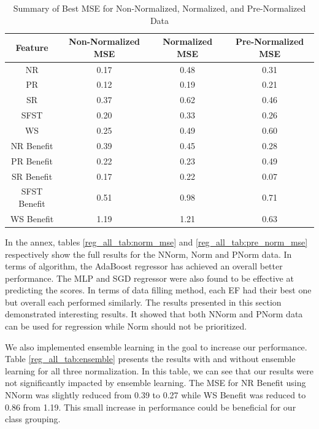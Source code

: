 \documentclass[12pt,letterpaper]{article}
\begin{document}
\begin{table}[H]
\centering
\begin{tabular}{|c|c|c|c|}
\hline
\textbf{Feature} & \textbf{Non-Normalized MSE} & \textbf{Normalized MSE} & \textbf{Pre-Normalized MSE} \\
\hline
NR & 0.17 & 0.48 & 0.31 \\
\hline
PR & 0.12 & 0.19 & 0.21 \\
\hline
SR & 0.37 & 0.62 & 0.46 \\
\hline
SFST & 0.20 & 0.33 & 0.26 \\
\hline
WS & 0.25 & 0.49 & 0.60 \\
\hline
NR Benefit & 0.39 & 0.45 & 0.28 \\
\hline
PR Benefit & 0.22 & 0.23 & 0.49 \\
\hline
SR Benefit & 0.17 & 0.22 & 0.07 \\
\hline
SFST Benefit & 0.51 & 0.98 & 0.71 \\
\hline
WS Benefit & 1.19 & 1.21 & 0.63 \\
\hline
\end{tabular}
\caption{Summary of Best MSE for Non-Normalized, Normalized, and Pre-Normalized Data}
\label{reg_all_tab:mse_summary}
\end{table}


In the annex, tables \ref{reg_all_tab:norm_mse} and \ref{reg_all_tab:pre_norm_mse} respectively show the full results for the NNorm, Norm and PNorm data.
In terms of algorithm, the AdaBoost regressor has achieved an overall better performance.
The MLP and SGD regressor were also found to be effective at predicting the scores.
In terms of data filling method, each \ac{EF} had their best one but overall each performed similarly.
The results presented in this section demonstrated interesting results.
It showed that both NNorm and PNorm data can be used for regression while Norm should not be prioritized.


We also implemented ensemble learning in the goal to increase our performance.
Table \ref{reg_all_tab:ensemble} presents the results with and without ensemble learning for all three normalization.
In this table, we can see that our results were not significantly impacted by ensemble learning.
The MSE for \ac{NR} Benefit using NNorm was slightly reduced from 0.39 to 0.27 while \ac{WS} Benefit was reduced to 0.86 from 1.19.
This small increase in performance could be beneficial for our class grouping.
\end{document}
